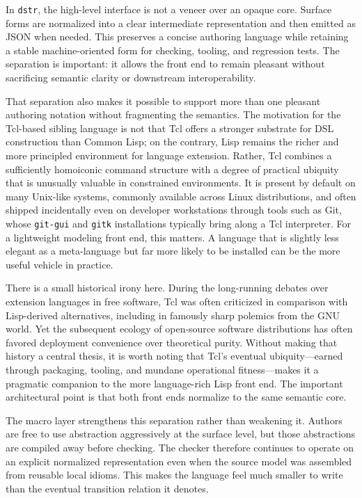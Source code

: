 \documentclass[11pt]{article}
\begin{document}
In \texttt{dstr}, the high-level interface is not a veneer over an opaque core.
Surface forms are normalized into a clear intermediate representation and then
emitted as JSON when needed. This preserves a concise authoring language while
retaining a stable machine-oriented form for checking, tooling, and regression
tests. The separation is important: it allows the front end to remain pleasant
without sacrificing semantic clarity or downstream interoperability.

That separation also makes it possible to support more than one pleasant
authoring notation without fragmenting the semantics. The motivation for the
Tcl-based sibling language is not that Tcl offers a stronger substrate for DSL
construction than Common Lisp; on the contrary, Lisp remains the richer and
more principled environment for language extension. Rather, Tcl combines a
sufficiently homoiconic command structure with a degree of practical ubiquity
that is unusually valuable in constrained environments. It is present by
default on many Unix-like systems, commonly available across Linux
distributions, and often shipped incidentally even on developer workstations
through tools such as Git, whose \texttt{git-gui} and \texttt{gitk}
installations typically bring along a Tcl interpreter. For a lightweight
modeling front end, this matters. A language that is slightly less elegant as a
meta-language but far more likely to be installed can be the more useful
vehicle in practice.

There is a small historical irony here. During the long-running debates over
extension languages in free software, Tcl was often criticized in comparison
with Lisp-derived alternatives, including in famously sharp polemics from the
GNU world. Yet the subsequent ecology of open-source software distributions has
often favored deployment convenience over theoretical purity. Without making
that history a central thesis, it is worth noting that Tcl's eventual
ubiquity---earned through packaging, tooling, and mundane operational
fitness---makes it a pragmatic companion to the more language-rich Lisp front
end. The important architectural point is that both front ends normalize to the
same semantic core.

The macro layer strengthens this separation rather than weakening it. Authors
are free to use abstraction aggressively at the surface level, but those
abstractions are compiled away before checking. The checker therefore continues
to operate on an explicit normalized representation even when the source model
was assembled from reusable local idioms. This makes the language feel much
smaller to write than the eventual transition relation it denotes.
\end{document}

